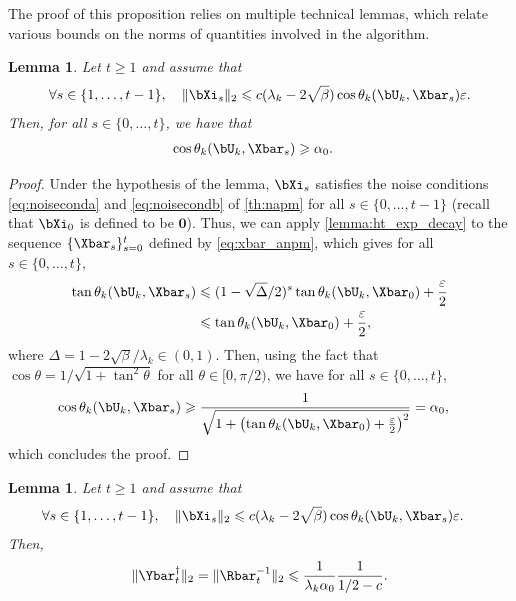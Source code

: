 \documentclass{article}
\theoremstyle{plain}
\newtheorem{lemma}[theorem]{Lemma}
\theoremstyle{definition}
\theoremstyle{remark}
\begin{document}
The proof of this proposition relies on multiple technical lemmas, which relate various bounds on the norms of quantities involved in the algorithm.


\begin{lemma}\label{lemma:bxi_implies_cos}
  Let $t\geqslant 1$ and assume that 
  \begin{align*}
    \forall s \in \{1, \dots, t-1\}, \quad \Vert\bXi_s\Vert_2 \leqslant c (\lambda_k - 2\sqrt{\beta}) \cos \theta_k(\bU_k, \Xbar_s) \varepsilon.
  \end{align*}
  Then, for all $s \in \{0,\dots,t\}$, we have that
  \begin{align}
    \cos\theta_k(\bU_k,\Xbar_s) & \geqslant \alpha_0. \label{eq:cos_theta_k_lb}
  \end{align}
\end{lemma}

\begin{proof}
  Under the hypothesis of the lemma, $\bXi_s$ satisfies the noise conditions \eqref{eq:noiseconda} and \eqref{eq:noisecondb} of \cref{th:napm} for all $s \in \{0, \dots, t-1\}$ (recall that $\bXi_0$ is defined to be $\mathbf{0}$). Thus, we can apply \cref{lemma:ht_exp_decay} to the sequence $\{\Xbar_s\}_{s=0}^t$ defined by \eqref{eq:xbar_anpm}, which gives for all $s \in \{0, \dots, t\}$,
  \begin{align*}
    \tan \theta_k(\bU_k, \Xbar_s) & \leqslant  (1-\sqrt{\Delta}/2)^s\tan \theta_k(\bU_k, \Xbar_0) + \frac{\varepsilon}{2} \\
    & \leqslant \tan \theta_k(\bU_k, \Xbar_0) + \frac{\varepsilon}{2},
  \end{align*}
  where $\Delta = 1 - 2\sqrt{\beta}/\lambda_k \in (0,1)$. Then, using the fact that $\cos\theta = 1/\sqrt{1+\tan^2\theta}$ for all $\theta \in [0,\pi/2)$, we have for all $s \in \{0, \dots, t\}$,
  \begin{align*}
    \cos\theta_k(\bU_k, \Xbar_s) & \geqslant \frac{1}{\sqrt{1 + \left(\tan \theta_k(\bU_k, \Xbar_0) + \frac{\varepsilon}{2}\right)^2}} = \alpha_0,
  \end{align*}
  which concludes the proof.
\end{proof}



\begin{lemma}\label{lemma:bxi_implies_ydagger}
  Let $t\geqslant 1$ and assume that 
  \begin{align*}
    & \forall s \in \{1, \dots, t-1\}, \quad \Vert\bXi_s\Vert_2 \leqslant c (\lambda_k - 2\sqrt{\beta}) \cos \theta_k(\bU_k, \Xbar_s) \varepsilon.
  \end{align*}
  Then,
  \begin{align}\label{eq:Ybardagger_UB}
    \Vert\Ybar_t^\dagger\Vert_2 = \Vert \Rbar_t^{-1}\Vert_2 \leqslant \frac{1}{\lambda_k\alpha_0}\frac{1}{1/2 - c}.
  \end{align}
\end{lemma}
\end{document}
